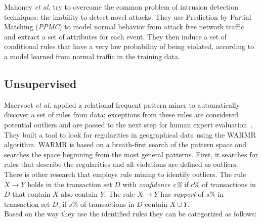 Mahoney {\em et al.} try to overcome the common problem of intrusion detection techniques: the inability to detect novel attacks. They use Prediction by Partial Matching ({\em PPMC}) to model normal behavior from attack free network traffic~\cite{Mahoney} and extract a set of attributes for each event. They then induce a set of conditional rules that have a very low probability of being violated, according to a model learned from normal traffic in the training data.\\  

\subsection{Unsupervised}
Maervoet {\em et al.} applied a relational frequent pattern miner to automatically discover a set of rules from data; exceptions from these rules are considered potential outliers and are passed to the next step for human expert evaluation~\cite{Maervoet2012}. They built a tool to look for regularities in geographical data using the WARMR algorithm. WARMR is based on a breath-first search of the pattern space and searches the space beginning from the most general patterns. First, it searches for rules that describe the regularities and all violations are defined as outliers.\\
There is other research that employs rule mining to identify outliers. The rule $X\rightarrow Y$ holds in the transaction set $D$ with \textit{confidence c\%} if $c\%$ of transactions in $D$ that contain $X$ also contain $Y$. The rule $X\rightarrow Y$ has \textit{support} of $s\%$ in transaction set  $D$, if $s\%$ of transactions in $D$ contain $X\cup Y$.\\
Based on the way they use the identified rules they can be categorized as follows: 
